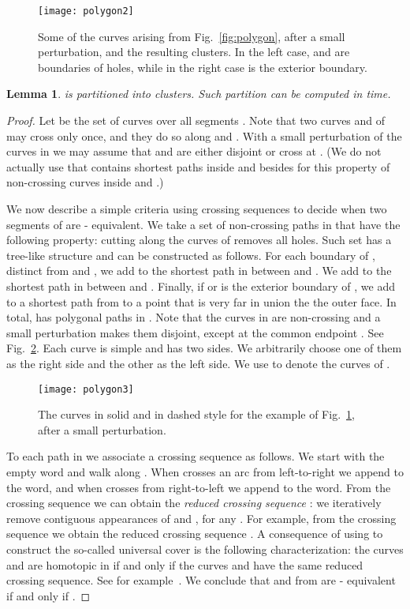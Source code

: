 \documentclass[11pt,a4paper]{article}
\newtheorem{lemma}[definition]{Lemma}
\begin{document}
\begin{figure}[t]
\centering
\texttt{[image: polygon2]}
\caption{Some of the curves  arising from Fig.~\ref{fig:polygon}, after a small perturbation, and the resulting clusters. In the left case,  and  are boundaries of holes, while in the right case  is the exterior boundary.}
\label{fig:polygon2}
\end{figure}

\begin{lemma}\label{le:clusters1}
 is partitioned into  clusters. Such partition can be computed in  time.
\end{lemma}
\begin{proof}
Let  be the set of curves  over all segments .
Note that two curves  and  of  may cross only once, and they do so along  and .
With a small perturbation of the curves in  we may assume that  and  are either disjoint or cross at .
(We do not actually use that  contains shortest paths inside  and  besides for this property of non-crossing curves inside  and .)

We now describe a simple criteria using crossing sequences to decide when two segments of  are - equivalent. We take a set  of non-crossing paths in  that have the following property: cutting  along the curves of  removes all holes. Such set  has a tree-like structure and can be constructed as follows. For each boundary  of , distinct from  and , we add to  the shortest path in  between  and . We add to  the shortest path in  between  and . Finally, if  or  is the exterior boundary of , we add to  a shortest path from  to a point that is very far in  union the the outer face. In total,  has  polygonal paths in . Note that the curves in  are non-crossing and a small perturbation makes them disjoint, except at the common endpoint . See Fig.~\ref{fig:polygon3}. Each curve  is simple and has two sides. We arbitrarily choose one of them as the right side and the other as the left side. We use  to denote the curves of .

\begin{figure}[t]
\centering
\texttt{[image: polygon3]}
\caption{The curves  in solid and  in dashed style for the example of Fig.~\ref{fig:polygon2}, after a small perturbation.}
\label{fig:polygon3}
\end{figure}

To each path  in  we associate a crossing sequence  as follows. We start with the empty word and walk along . When  crosses an arc  from left-to-right we append  to the word, and when  crosses  from right-to-left we append   to the word. From the crossing sequence  we can obtain the \emph{reduced crossing sequence}  : we iteratively remove contiguous appearances of  and , for any . For example, from the crossing sequence  we obtain the reduced crossing sequence . A consequence of using  to construct the so-called universal cover is the following characterization:
the curves  and  are homotopic in  if and only if the curves  and  have the same reduced crossing sequence. See for example~\cite{clms-04}. We conclude that  and  from  are - equivalent if and only if 
.


\end{proof}
\end{document}
